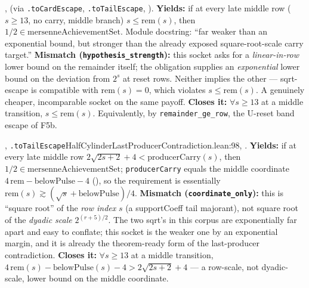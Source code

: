 \begin{obs} 
,
(via \texttt{.toCardEscape}, \texttt{.toTailEscape}, ).
\textbf{Yields:} if at every late middle row ($s \ge 13$, no carry, middle branch)
$s \le \mathrm{rem}(s)$, then $1/2 \in \mathrm{mersenneAchievementSet}$. Module docstring: ``far
weaker than an exponential bound, but stronger than the already exposed square-root-scale carry
target.''
\textbf{Mismatch (\texttt{hypothesis\_strength}):} this socket asks for a \emph{linear-in-row}
lower bound on the remainder itself; the obligation supplies an \emph{exponential} lower bound
on the deviation from $2^s$ at reset rows. Neither implies the other — sqrt-escape is compatible
with $\mathrm{rem}(s)=0$, which violates $s \le \mathrm{rem}(s)$. A genuinely cheaper, incomparable
socket on the same payoff.
\textbf{Closes it:} $\forall s \ge 13$ at a middle transition, $s \le \mathrm{rem}(s)$.
Equivalently, by \texttt{remainder\_ge\_row}, the U-reset band escape of F5b.
\end{obs}

\begin{obs} 
,
\texttt{.toTailEscape}{}{HalfCylinderLastProducerContradiction.lean:98},
.
\textbf{Yields:} if at every late middle row $2\sqrt{2s+2}+4 < \mathrm{producerCarry}(s)$, then
$1/2 \in \mathrm{mersenneAchievementSet}$; \texttt{producerCarry} equals the middle coordinate
$4\,\mathrm{rem}-\mathrm{belowPulse}-4$
(), so the requirement is essentially
$\mathrm{rem}(s) \gtrsim (\sqrt{s}+\mathrm{belowPulse})/4$.
\textbf{Mismatch (\texttt{coordinate\_only}):} this is ``square root'' of the \emph{row index}
$s$ (a supportCoeff tail majorant), not square root of the \emph{dyadic scale} $2^{(r+5)/2}$. The
two sqrt's in this corpus are exponentially far apart and easy to conflate; this socket is the
weaker one by an exponential margin, and it is already the theorem-ready form of the
last-producer contradiction.
\textbf{Closes it:} $\forall s \ge 13$ at a middle transition, $4\,\mathrm{rem}(s) -
\mathrm{belowPulse}(s) - 4 > 2\sqrt{2s+2}+4$ — a row-scale, not dyadic-scale, lower bound on the
middle coordinate.
\end{obs}


